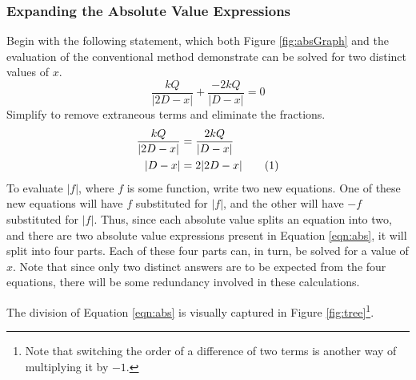 \documentclass[titlepage]{article}
\begin{document}
\subsubsection*{Expanding the Absolute Value Expressions}
Begin with the following statement, which both Figure \ref{fig:absGraph} and the evaluation of the conventional method demonstrate can be solved for two distinct values of $x$.
\begin{equation*}
    \frac{kQ}{|2D-x|}+\frac{-2kQ}{|D-x|}=0
\end{equation*}
Simplify to remove extraneous terms and eliminate the fractions.
\begin{align*}
    \frac{kQ}{|2D-x|} &= \frac{2kQ}{|D-x|}\\
    |D-x| &= 2|2D-x|\stepcounter{equation}\tag{\theequation}\label{eqn:abs}
\end{align*}
To evaluate $|f|$, where $f$ is some function, write two new equations. One of these new equations will have $f$ substituted for $|f|$, and the other will have $-f$ substituted for $|f|$. Thus, since each absolute value splits an equation into two, and there are two absolute value expressions present in Equation \ref{eqn:abs}, it will split into four parts. Each of these four parts can, in turn, be solved for a value of $x$. Note that since only two distinct answers are to be expected from the four equations, there will be some redundancy involved in these calculations.\par
The division of Equation \ref{eqn:abs} is visually captured in Figure \ref{fig:tree}\footnote{Note that switching the order of a difference of two terms is another way of multiplying it by $-1$.}.
\end{document}

